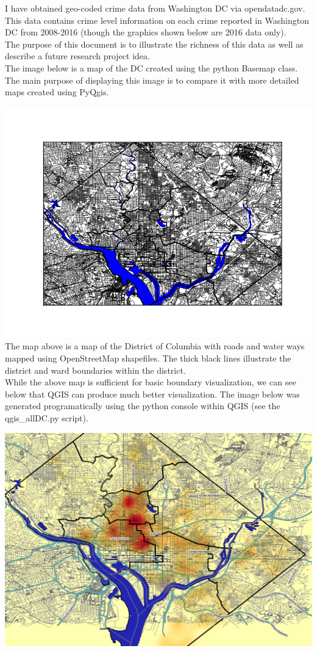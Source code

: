 \documentclass{article}
\begin{document}
I have obtained geo-coded crime data from Washington DC via opendatadc.gov. This data contains crime level information on each crime reported in Washington DC from 2008-2016 (though the graphics shown below are 2016 data only).\\

The purpose of this document is to illustrate the richness of this data as well as describe a future research project idea.\\

The image below is a map of the DC created using the python Basemap class. The main purpose of displaying this image is to compare it with more detailed maps created using PyQgis.

\includegraphics[scale = .65]{Python_allDc}\\

The map above is a map of the District of Columbia with roads and water ways mapped using OpenStreetMap shapefiles. The thick black lines illustrate the district and ward boundaries within the district.\\

While the above map is sufficient for basic boundary visualization, we can see below that QGIS can produce much better visualization. The image below was generated programatically using the python console within QGIS (see the qgis\_allDC.py script).


\includegraphics[scale = .45]{DC_Heatmap} 
\end{document}

